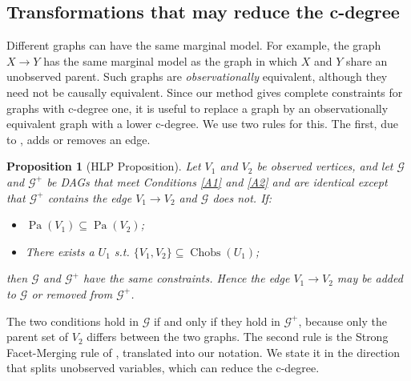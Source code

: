 \documentclass[12pt]{article}
\newtheorem{proposition}{Proposition}
\DeclareMathOperator{\Chobs}{Chobs}
\DeclareMathOperator{\Pa}{Pa}
\begin{document}
\clearpage

\subsection{Transformations that may reduce the c-degree} \label{graphmod}

Different graphs can have the same marginal model. For example, the graph $X \rightarrow Y$ has the same marginal model as the graph in which $X$ and $Y$ share an unobserved parent. Such graphs are \emph{observationally} equivalent, although they need not be causally equivalent. Since our method gives complete constraints for graphs with c-degree one, it is useful to replace a graph by an observationally equivalent graph with a lower c-degree. We use two rules for this. The first, due to \citet[Theorem 26.4; see also Proposition 4 of \citealp{ansanelli2025observationalpartialordercausal}]{henson2014theory}, adds or removes an edge.

\begin{proposition}[HLP Proposition] \label{prop:hlp}
  Let $V_1$ and $V_2$ be observed vertices, and let $\mathcal{G}$ and $\mathcal{G}^+$ be DAGs that meet Conditions \ref{A1} and \ref{A2} and are identical except that $\mathcal{G}^+$ contains the edge $V_1 \to V_2$ and $\mathcal{G}$ does not.
  If:
  \begin{itemize}
      \item $\Pa(V_1) \subseteq \Pa(V_2)$;
      \item There exists a $U_1$ s.t. $\{V_1, V_2\} \subseteq \Chobs(U_1)$;
  \end{itemize}
  then $\mathcal{G}$ and $\mathcal{G}^+$ have the same constraints. Hence the edge $V_1 \to V_2$ may be added to $\mathcal{G}$ or removed from $\mathcal{G}^+$.
\end{proposition}

The two conditions hold in $\mathcal{G}$ if and only if they hold in $\mathcal{G}^+$, because only the parent set of $V_2$ differs between the two graphs. The second rule is the Strong Facet-Merging rule of \citet[Proposition 8; see also Proposition 15]{ansanelli2025observationalpartialordercausal}, translated into our notation. We state it in the direction that splits unobserved variables, which can reduce the c-degree.
\end{document}
